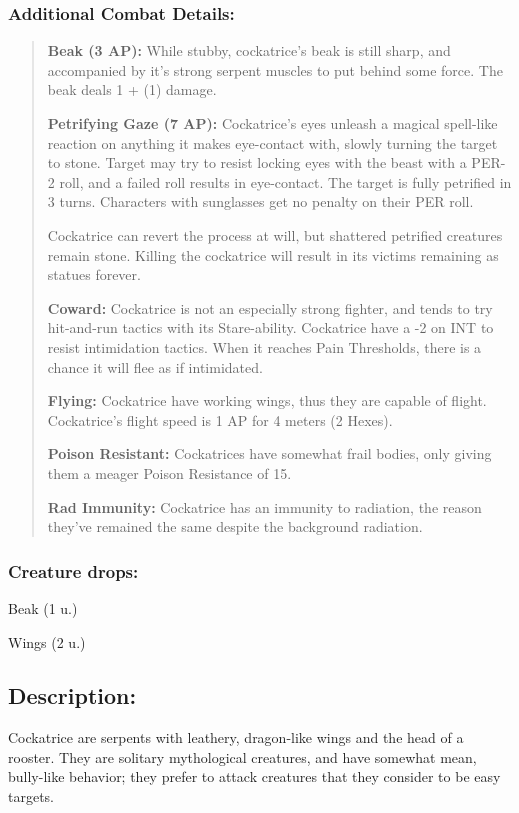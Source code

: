 \documentclass[11pt,a4paper,twocolumn]{book}
\begin{document}
	\subsubsection*{Additional Combat Details:}
	\begin{verse}
		\textbf{Beak (3 AP):} While stubby, cockatrice's beak is still sharp, and accompanied by it's strong serpent muscles to put behind some force. The beak deals 1 + (1) damage.
		
		\textbf{Petrifying Gaze (7 AP):} Cockatrice's eyes unleash a magical spell-like reaction on anything it makes eye-contact with, slowly turning the target to stone. Target may try to resist locking eyes with the beast with a PER-2 roll, and a failed roll results in eye-contact. The target is fully petrified in 3 turns. Characters with sunglasses get no penalty on their PER roll.
		
		Cockatrice can revert the process at will, but shattered petrified creatures remain stone. Killing the cockatrice will result in its victims remaining as statues forever. 
		
		\textbf{Coward:} Cockatrice is not an especially strong fighter, and tends to try hit-and-run tactics with its Stare-ability. Cockatrice have a -2 on INT to resist intimidation tactics. When it reaches Pain Thresholds, there is a chance it will flee as if intimidated.
		
		\textbf{Flying:} Cockatrice have working wings, thus they are capable of flight. Cockatrice's flight speed is 1 AP for 4 meters (2 Hexes).
		
		\textbf{Poison Resistant:} Cockatrices have somewhat frail bodies, only giving them a meager Poison Resistance of 15.
		
		\textbf{Rad Immunity:} Cockatrice has an immunity to radiation, the reason they've remained the same despite the background radiation.
	\end{verse}
	
	\subsubsection*{Creature drops:}
	\begin{compactitem}
		\item Beak (1 u.)
		\item Wings (2 u.)
	\end{compactitem}	
	
	\subsection*{Description:}
	Cockatrice are serpents with leathery, dragon-like wings and the head of a rooster. They are solitary mythological creatures, and have somewhat mean, bully-like behavior; they prefer to attack creatures that they consider to be easy targets. 
	
\end{document}
